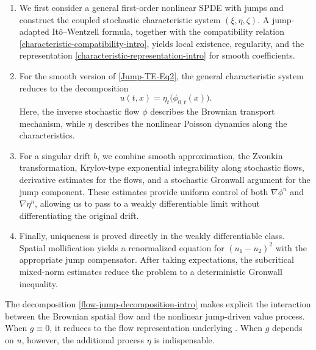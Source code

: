 \documentclass[12pt,oneside, reqno]{amsart}
\numberwithin{equation}{section}
\begin{document}
	\begin{enumerate}
		\item
		We first consider a general first-order nonlinear SPDE with jumps and	construct the coupled stochastic characteristic system	\((\xi,\eta,\zeta)\). A jump-adapted It\^o--Wentzell formula,	together with the compatibility relation
		\eqref{characteristic-compatibility-intro}, yields local existence,	regularity, and the representation	\eqref{characteristic-representation-intro} for smooth	coefficients.
		
		\item
		For the smooth version of \eqref{Jump-TE-Eq2}, the general	characteristic system reduces to the decomposition
		\begin{equation}\label{flow-jump-decomposition-intro}
			u(t,x)
			=
			\eta_t\bigl(\phi_{0,t}(x)\bigr).
		\end{equation}
		Here, the inverse stochastic flow \(\phi\) describes the Brownian	transport mechanism, while \(\eta\) describes the nonlinear	Poisson dynamics along the characteristics.
		
		\item
		For a singular drift \(b\), we combine smooth approximation, the	Zvonkin transformation, Krylov-type exponential integrability	along stochastic flows, derivative estimates for the flows, and a	stochastic Gronwall argument for the jump component. These	estimates provide uniform control of both	\(\nabla\phi^n\) and \(\nabla\eta^n\), allowing us to pass to a	weakly differentiable limit without differentiating the original	drift.
		
		\item
		Finally, uniqueness is proved directly in the weakly	differentiable class. Spatial mollification yields a renormalized	equation for \((u_1-u_2)^2\) with the appropriate jump	compensator. After taking expectations, the subcritical	mixed-norm estimates reduce the problem to a deterministic	Gronwall inequality.
	\end{enumerate}
	
	The decomposition \eqref{flow-jump-decomposition-intro} makes explicit	the interaction between the Brownian spatial flow and the nonlinear	jump-driven value process. When \(g\equiv0\), it reduces to the flow
	representation underlying	\cite{FlandoliGubinelli2010,FedrizziFlandoli2013a}. When \(g\) depends	on \(u\), however, the additional process \(\eta\) is indispensable.
	
\end{document}
